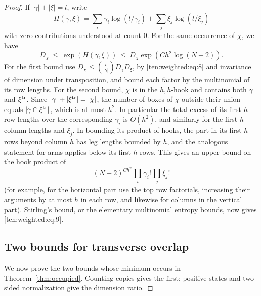 \begin{proof}
If \(|\gamma|+|\xi|=l\), write
\[
 H(\gamma,\xi)=\sum_i\gamma_i\log(l/\gamma_i)+\sum_j\xi_j\log(l/\xi_j)
\]
with zero contributions understood at count 0. For the same occurrence of \(\chi\), we have
\begin{equation}
 D_\chi\ \le\ \exp(H(\gamma,\xi))\ \le\ D_\chi\exp(C h^2\log(N+2)).                         \label{ten:weighted:eq:9}
\end{equation}
For the first bound use \(D_\chi\le\binom{l}{|\gamma|}D_\gamma D_\xi\), by \eqref{ten:weighted:eq:8} and invariance of dimension under transposition, and bound each factor by the multinomial of its row lengths. For the second bound, \(\chi\) is in the \(h,h\)-hook and contains both \(\gamma\) and \(\xi^{\rm tr}\). Since \(|\gamma|+|\xi^{\rm tr}|=|\chi|\), the number of boxes of \(\chi\) outside their union equals \(|\gamma\cap\xi^{\rm tr}|\), which is at most \(h^2\). In particular the total excess of its first \(h\) row lengths over the corresponding \(\gamma_i\) is \(O(h^2)\), and similarly for the first \(h\) column lengths and \(\xi_j\). In bounding its product of hooks, the part in its first \(h\) rows beyond column \(h\) has leg lengths bounded by \(h\), and the analogous statement for arms applies below its first \(h\) rows. This gives an upper bound on the hook product of
\[
 (N+2)^{C h^2}\prod_i\gamma_i!\prod_j\xi_j!
\]
(for example, for the horizontal part use the top row factorials, increasing their arguments by at most \(h\) in each row, and likewise for columns in the vertical part). Stirling's bound, or the elementary multinomial entropy bounds, now gives \eqref{ten:weighted:eq:9}.


\subsection{Two bounds for transverse overlap}
\label{ten:weighted:part:127}
We now prove the two bounds whose minimum occurs in Theorem~\ref{thm:occupied}. Counting copies gives the first; positive states and two-sided normalization give the dimension ratio.


\end{proof}
